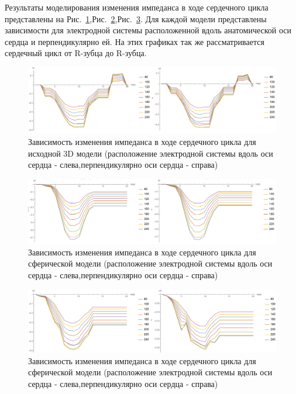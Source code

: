 \documentclass[conference]{IEEEtran}
\begin{document}
Результаты моделирования изменения импеданса в ходе сердечного цикла представлены на Рис.~\ref{real},Рис.~\ref{fig:sphere},Рис.~\ref{fig:ellipse}.
Для каждой модели представлены зависимости для электродной системы расположенной вдоль анатомической оси сердца и перпендикулярно ей.
На этих графиках так же рассматривается сердечный цикл от R-зубца до R-зубца.

\begin{figure}[tbph]
    \centering
    \includegraphics[width=\linewidth]{fig/real}
    \caption{Зависимость изменения импеданса в ходе сердечного цикла для исходной 3D модели (расположение электродной системы вдоль оси сердца - слева,перпендикулярно оси сердца - справа)}
    \label{real}
\end{figure}

\begin{figure}[tbph]
    \centering
    \includegraphics[width=\linewidth]{fig/sphere}
    \caption{Зависимость изменения импеданса в ходе сердечного цикла для сферической модели (расположение электродной системы вдоль оси сердца - слева,перпендикулярно оси сердца - справа)}
    \label{fig:sphere}
\end{figure}

\begin{figure}[tbph]
    \centering
    \includegraphics[width=\linewidth]{ellipse}
    \caption{Зависимость изменения импеданса в ходе сердечного цикла для сферической модели (расположение электродной системы вдоль оси сердца - слева,перпендикулярно оси сердца - справа)}
    \label{fig:ellipse}
\end{figure}
\end{document}
